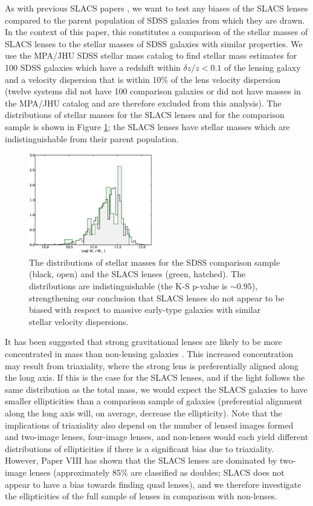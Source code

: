 \documentclass[iop]{emulateapj}
\begin{document}
As with previous SLACS papers \citep[Paper II, Paper V, Paper VIII; also see][]{auger}, we want to test any biases of the SLACS lenses compared to the parent population of SDSS galaxies from which they are drawn. In the context of this paper, this constitutes a comparison of the stellar masses of SLACS lenses to the stellar masses of SDSS galaxies with similar properties. We use the MPA/JHU SDSS stellar mass catalog to find stellar mass estimates for 100 SDSS galaxies which have a redshift within $\delta z/z < 0.1$ of the lensing galaxy and a velocity dispersion that is within 10\% of the lens velocity dispersion (twelve systems did not have 100 comparison galaxies or did not have masses in the MPA/JHU catalog and are therefore excluded from this analysis). The distributions of stellar masses for the SLACS lenses and for the comparison sample is shown in Figure \ref{F_sdss_twins}; the SLACS lenses have stellar masses which are indistinguishable from their parent population.

\begin{figure}[ht]
 \centering
 \includegraphics[width=0.48\textwidth,clip]{f10.eps}
 \caption{The distributions of stellar masses for the SDSS comparison sample (black, open) and the SLACS lenses (green, hatched). The distributions are indistinguishable (the K-S p-value is $\sim0.95$), strengthening our conclusion that SLACS lenses do not appear to be biased with respect to massive early-type galaxies with similar stellar velocity dispersions.}
 \label{F_sdss_twins}
\end{figure}

It has been suggested that strong gravitational lenses are likely to be more concentrated in mass than non-lensing galaxies \citep[e.g.,][]{vdv,mandelbaum}. This increased concentration may result from triaxiality, where the strong lens is preferentially aligned along the long axis. If this is the case for the SLACS lenses, and if the light follows the same distribution as the total mass, we would expect the SLACS galaxies to have smaller ellipticities than a comparison sample of galaxies (preferential alignment along the long axis will, on average, decrease the ellipticity). Note that the implications of triaxiality also depend on the number of lensed images formed \citep{rozo,mandelbaum} and two-image lenses, four-image lenses, and non-lenses would each yield different distributions of ellipticities if there is a significant bias due to triaxiality. However, Paper VIII has shown that the SLACS lenses are dominated by two-image lenses (approximately 85\% are classified as doubles; SLACS does not appear to have a bias towards finding quad lenses), and we therefore investigate the ellipticities of the full sample of lenses in comparison with non-lenses.
\end{document}
